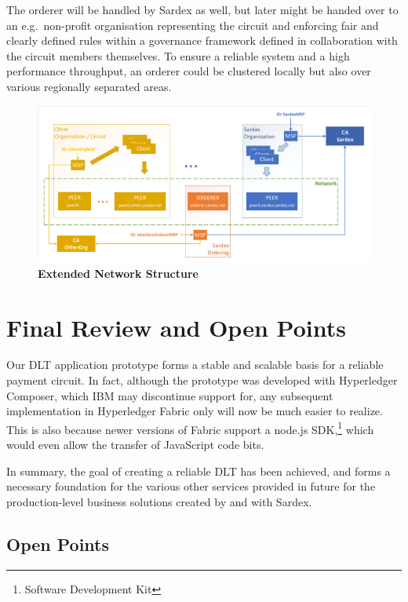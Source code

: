 The orderer will be handled by Sardex as well, but later might be handed over to an e.g.\ non-profit organisation representing the circuit and enforcing fair and clearly defined rules within a governance framework defined in collaboration with the circuit members themselves. To ensure a reliable system and a high performance throughput, an orderer could be clustered locally but also over various regionally separated areas.

\begin{figure}[htbp]
  \centering
  \includegraphics[width=1.0\textwidth, clip, trim=1mm 1mm 1mm 1mm]{Figures/extended-network}
  \caption{\bf\small Extended Network Structure}
  \label{fig:prototype-net-ext}
\end{figure}

\section{Final Review and Open Points}

Our DLT application prototype forms a stable and scalable basis for a reliable payment circuit. In fact, although the prototype was developed with Hyperledger Composer, which IBM may discontinue support for, any subsequent implementation in Hyperledger Fabric only will now be much easier to realize. This is also because newer versions of Fabric support a node.js SDK,\footnote{Software Development Kit} which would even allow the transfer of JavaScript code bits.

In summary, the goal of creating a reliable DLT has been achieved, and forms a necessary foundation for the various other services provided in future for the production-level business solutions created by and with Sardex.

\subsection{Open Points}

